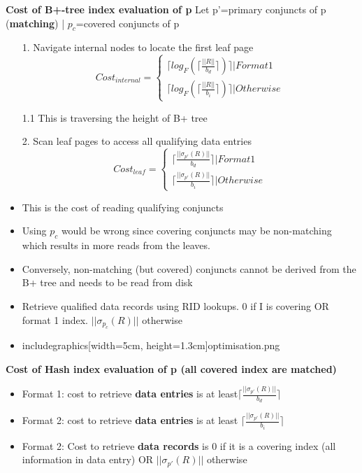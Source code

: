 \documentclass[10pt, landscape]{article}
\newcommand{\ceil}[1]{\lceil #1 \rceil}
\begin{document}
\begin{multicols}{4}
\textbf{Cost of B+-tree index evaluation of p} \newline
Let p'=primary conjuncts of p (\textbf{matching}) | $p_c$=covered conjuncts of p \newline
\begin{itemize}
  \item[1.] Navigate internal nodes to locate the first leaf page
  $$
  Cost_{internal} = \left\{
    \begin{array}{ll}
        \ceil{log_F(\ceil{\frac{||R||}{b_d}})} | Format 1 \\
        \ceil{log_F(\ceil{\frac{||R||}{b_i}})} | Otherwise
    \end{array}
\right.
  $$ \newline
  \item[1.1] This is traversing the height of B+ tree
  \item[2.] Scan leaf pages to access all qualifying data entries
  $$
  Cost_{leaf} = \left\{
    \begin{array}{ll}
        {\ceil{\frac{||\sigma_{p'}(R)||}{b_d}}} | Format 1 \\
        {\ceil{\frac{||\sigma_{p'}(R)||}{b_i}}} | Otherwise
    \end{array}
\right.
  $$ \newline
  \item This is the cost of reading qualifying conjuncts
  \item Using $p_c$ would be wrong since covering conjuncts may be non-matching which results in more reads from the leaves. 
  \item Conversely, non-matching (but covered) conjuncts cannot be derived from the B+ tree and needs to be read from disk
  \item Retrieve qualified data records using RID lookups. 0 if I is covering OR format 1 index. $||\sigma_{p_c}(R)||$ otherwise
  \item includegraphics[width=5cm, height=1.3cm]{optimisation.png}
\end{itemize}

\textbf{Cost of Hash index evaluation of p (all covered index are matched)} \\
\begin{itemize}
  \item Format 1: cost to retrieve \textbf{data entries} is at least$\ceil{\frac{||\sigma_{p'}(R)||}{b_d}}$
  \item Format 2: cost to retrieve \textbf{data entries} is at least $\ceil{\frac{||\sigma_{p'}(R)||}{b_i}}$
  \item Format 2: Cost to retrieve \textbf{data records} is 0 if it is a covering index (all information in data entry) OR $||\sigma_{p'}(R)||$ otherwise
\end{itemize}


\end{multicols}
\end{document}
